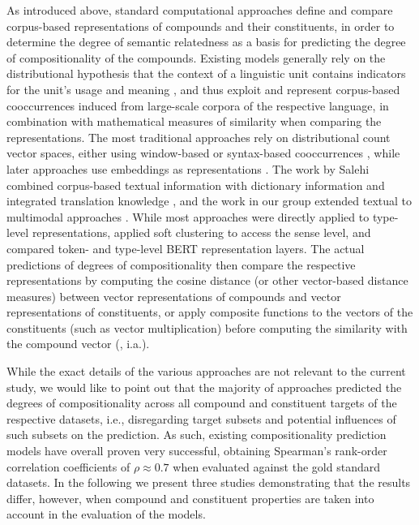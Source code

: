 \documentclass[output=paper,colorlinks,citecolor=brown]{langscibook}
\begin{document}
As introduced above, standard computational approaches define and compare corpus-based representations of compounds and their constituents, in order to determine the degree of semantic relatedness as a basis for predicting the degree of compositionality of the compounds. Existing models generally rely on the distributional hypothesis that the context of a linguistic unit contains indicators for the unit's usage and meaning \citep{Harris:54, Firth:57}, and thus exploit and represent corpus-based cooccurrences induced from large-scale corpora of the respective language, in combination with mathematical measures of similarity when comparing the representations. The most traditional approaches rely on distributional count vector spaces, either using window-based or syntax-based cooccurrences \citep{ReddyEtAl:11a, ReddyEtAl:11b, SchulteImWaldeEtAl:13, SchulteImWaldeEtAl:16b}, while later approaches use embeddings as representations \citep{SalehiEtAl:15, CordeiroEtAl:19, Alipoor/SchulteImWalde:20, Miletic/SchulteImWalde:23}.  The work by Salehi combined corpus-based textual information with dictionary information \citep{SalehiEtAl:14} and integrated translation knowledge \citep{Salehi/Cook:13, SalehiEtAl:14b}, and the work in our group extended textual to multimodal approaches \citep{Roller/SchulteImWalde:13, Koeper/SchulteImWalde:17b}. While most approaches were directly applied to type-level representations, \citet{Bott/SchulteImWalde:17} applied soft clustering to access the sense level, and \citet{Miletic/SchulteImWalde:23} compared token- and type-level BERT representation layers.
The actual predictions of degrees of compositionality then compare the respective representations by computing the cosine distance (or other vector-based distance measures) between vector representations of compounds and vector representations of constituents, or apply composite functions to the vectors of the constituents (such as vector multiplication) before computing the similarity with the compound vector (\citealt{Mitchell/Lapata:10, ReddyEtAl:11a, Hermann:14, DimaEtAl:19, Alipoor/SchulteImWalde:20}, i.a.).

While the exact details of the various approaches are not relevant to the current study, we would like to point out that the majority of approaches predicted the degrees of compositionality across all compound and constituent targets of the respective datasets, i.e., disregarding target subsets and potential influences of such subsets on the prediction. As such, existing compositionality prediction models have overall proven very successful, obtaining Spearman's rank-order correlation coefficients \citep{Siegel/Castellan:88} of $\rho \approx 0.7$ when evaluated against the gold standard datasets. In the following we present three studies demonstrating that the results differ, however, when compound and constituent properties are taken into account in the evaluation of the models.
\end{document}

